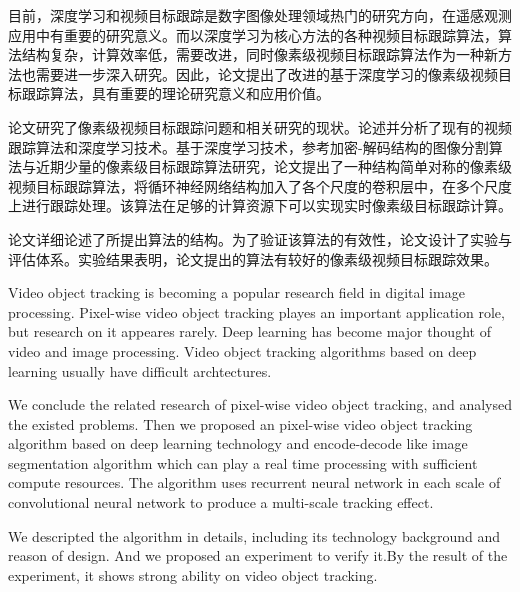 
\begin{cabstract}
	目前，深度学习和视频目标跟踪是数字图像处理领域热门的研究方向，在遥感观测应用中有重要的研究意义。而以深度学习为核心方法的各种视频目标跟踪算法，算法结构复杂，计算效率低，需要改进，同时像素级视频目标跟踪算法作为一种新方法也需要进一步深入研究。因此，论文提出了改进的基于深度学习的像素级视频目标跟踪算法，具有重要的理论研究意义和应用价值。
	\par
	论文研究了像素级视频目标跟踪问题和相关研究的现状。论述并分析了现有的视频跟踪算法和深度学习技术。基于深度学习技术，参考加密-解码结构的图像分割算法与近期少量的像素级目标跟踪算法研究，论文提出了一种结构简单对称的像素级视频目标跟踪算法，将循环神经网络结构加入了各个尺度的卷积层中，在多个尺度上进行跟踪处理。该算法在足够的计算资源下可以实现实时像素级目标跟踪计算。
	\par
	论文详细论述了所提出算法的结构。为了验证该算法的有效性，论文设计了实验与评估体系。实验结果表明，论文提出的算法有较好的像素级视频目标跟踪效果。
\end{cabstract}

\begin{eabstract}
	Video object tracking is becoming a popular research field in digital image processing. Pixel-wise video object tracking playes an important application role, but research on it appeares rarely. Deep learning has become major thought of video and image processing. Video object tracking algorithms based on deep learning usually have difficult archtectures. 
	\par
	We conclude the related research of pixel-wise video object tracking, and analysed the existed problems. Then we proposed an pixel-wise video object tracking algorithm based on deep learning technology and encode-decode like image segmentation algorithm which can play a real time processing with sufficient compute resources. The algorithm uses recurrent neural network in each scale of convolutional neural network to produce a multi-scale tracking effect.
	\par
	We descripted the algorithm in details, including its technology background and reason of design. And we proposed an experiment to verify it.By the result of the experiment, it shows strong ability on video object tracking.
\end{eabstract}

